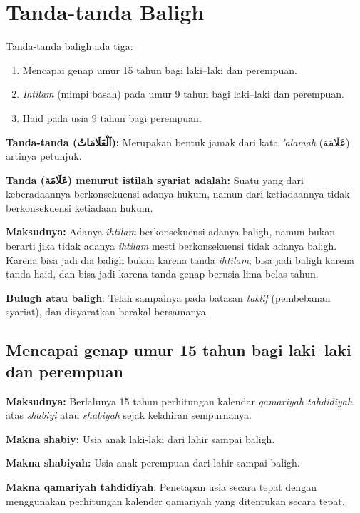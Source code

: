 \chapter{Tanda-tanda Baligh}

\begin{matanbox}[Matan]
Tanda-tanda baligh ada tiga:
\begin{enumerate}
    \item Mencapai genap umur 15 tahun bagi laki–laki dan perempuan.
    \item \textit{Ihtilam} (mimpi basah) pada umur 9 tahun bagi laki–laki dan perempuan.
    \item Haid pada usia 9 tahun bagi perempuan.
\end{enumerate}
\end{matanbox}

\textbf{Tanda-tanda (\textarabic{اَلْعَلَامَاتُ}):} Merupakan bentuk jamak dari kata \textit{'alamah} (\textarabic{عَلَامَة}) artinya petunjuk.

\textbf{Tanda (\textarabic{عَلَامَة}) menurut istilah syariat adalah:} Suatu yang dari keberadaannya berkonsekuensi adanya hukum, namun dari ketiadaannya tidak berkonsekuensi ketiadaan hukum.

\textbf{Maksudnya:} Adanya \textit{ihtilam} berkonsekuensi adanya baligh, namun bukan berarti jika tidak adanya \textit{ihtilam} mesti berkonsekuensi tidak adanya baligh. Karena bisa jadi dia baligh bukan karena tanda \textit{ihtilam}; bisa jadi baligh karena tanda haid, dan bisa jadi karena tanda genap berusia lima belas tahun.

\textbf{Bulugh atau baligh}: Telah sampainya pada batasan \textit{taklif} (pembebanan syariat), dan disyaratkan berakal bersamanya.

\section{Mencapai genap umur 15 tahun bagi laki–laki dan perempuan}

\textbf{Maksudnya:} Berlalunya 15 tahun perhitungan kalendar \textit{qamariyah tahdidiyah} atas \textit{shabiyi} atau \textit{shabiyah} sejak kelahiran sempurnanya.

\textbf{Makna shabiy:} Usia anak laki-laki dari lahir sampai baligh.

\textbf{Makna shabiyah:} Usia anak perempuan dari lahir sampai baligh.

\textbf{Makna qamariyah tahdidiyah}: Penetapan usia secara tepat dengan menggunakan perhitungan kalender qamariyah yang ditentukan secara tepat.

